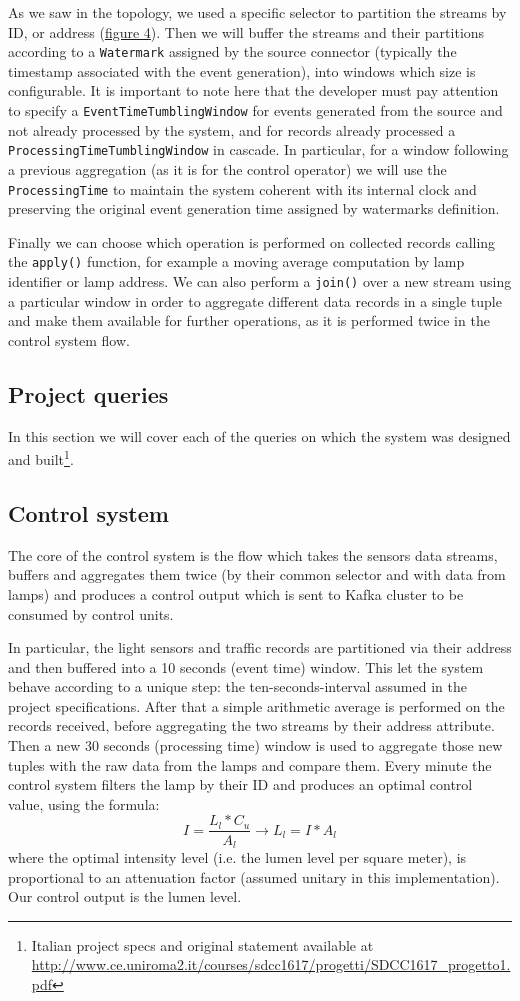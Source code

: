 As we saw in the topology, we used a specific selector to partition the streams by ID, or address (\hyperref[fig:ember_operation_flow]{figure 4}). Then we will buffer the streams and their partitions according to a \texttt{Watermark} assigned by the source connector (typically the timestamp associated with the event generation), into windows which size is configurable. It is important to note here that the developer must pay attention to specify a \texttt{EventTimeTumblingWindow} for events generated from the source and not already processed by the system, and for records already processed a \texttt{ProcessingTimeTumblingWindow} in cascade. In particular, for a window following a previous aggregation (as it is for the control operator) we will use the \texttt{ProcessingTime} to maintain the system coherent with its internal clock and preserving the original event generation time assigned by watermarks definition.

Finally we can choose which operation is performed on collected records calling the \texttt{apply()} function, for example a moving average computation by lamp identifier or lamp address. We can also perform a \texttt{join()} over a new stream using a particular window in order to aggregate different data records in a single tuple and make them available for further operations, as it is performed twice in the control system flow.

\subsection{Project queries}
In this section we will cover each of the queries on which the system was designed and built\footnote{Italian project specs and original statement available at \url{http://www.ce.uniroma2.it/courses/sdcc1617/progetti/SDCC1617_progetto1.pdf}}.

\subsection*{Control system}
The core of the control system is the flow which takes the sensors data streams, buffers and aggregates them twice (by their common selector and with data from lamps) and produces a control output which is sent to Kafka cluster to be consumed by control units.

In particular, the light sensors and traffic records are partitioned via their address and then buffered into a 10 seconds (event time) window. This let the system behave according to a unique step: the ten-seconds-interval assumed in the project specifications. After that a simple arithmetic average is performed on the records received, before aggregating the two streams by their address attribute. Then a new 30 seconds (processing time) window is used to aggregate those new tuples with the raw data from the lamps and compare them. Every minute the control system filters the lamp by their ID and produces an optimal control value, using the formula:
	$$I = \frac{L_l*C_u}{A_l} \rightarrow L_l = I * A_l$$
	where the optimal intensity level (i.e. the lumen level per square meter), is proportional to an attenuation factor (assumed unitary in this implementation). Our control output is the lumen level.

